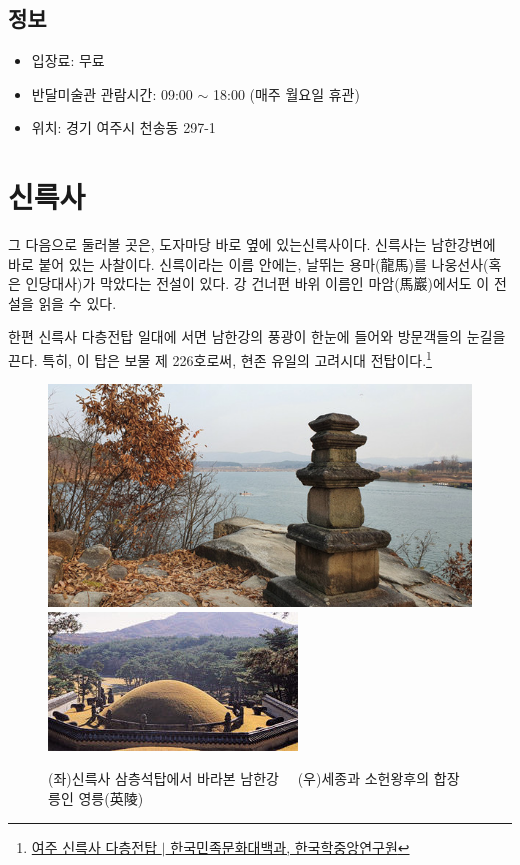 \subsection{정보}

\begin{itemize}
\item 입장료: 무료
\item 반달미술관 관람시간: 09:00 $\sim$ 18:00 (매주 월요일 휴관)
\item 위치: 경기 여주시 천송동 297-1
\end{itemize}

\section{신륵사}
그 다음으로 둘러볼 곳은, 도자마당 바로 옆에 있는신륵사이다. 신륵사는 남한강변에 바로 붙어 있는 사찰이다. 
신륵이라는 이름 안에는, 날뛰는 용마(龍馬)를 나웅선사(혹은 인당대사)가 막았다는 전설이 있다.
강 건너편 바위 이름인 마암(馬巖)에서도 이 전설을 읽을 수 있다.


한편 신륵사 다층전탑 일대에 서면 남한강의 풍광이 한눈에 들어와 방문객들의 눈길을 끈다. 
특히, 이 탑은 보물 제 226호로써, 현존 유일의 고려시대 전탑이다.\footnote{
\href{https://terms.naver.com/entry.naver?docId=560144&cid=46656&categoryId=46656}{여주 신륵사 다층전탑 $|$ 한국민족문화대백과, 한국학중앙연구원}} 
 
 \begin{figure}[ht]
    \centering
    \includegraphics[width=.4\textwidth]{img/신륵사 삼층석탑.jpg}
    \includegraphics[width=.4\textwidth]{img/영릉.jpg}
    \caption{(좌)신륵사 삼층석탑에서 바라본 남한강\protect\footnotemark  $\quad$ (우)세종과 소헌왕후의 합장릉인 영릉(英陵)\protect\footnotemark}
    \label{fig:my_labe5}
\end{figure}

